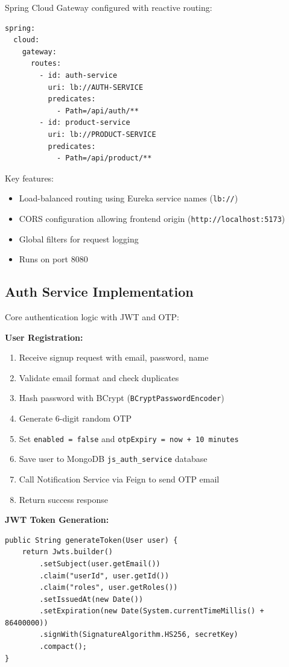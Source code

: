 Spring Cloud Gateway configured with reactive routing:

\begin{verbatim}
spring:
  cloud:
    gateway:
      routes:
        - id: auth-service
          uri: lb://AUTH-SERVICE
          predicates:
            - Path=/api/auth/**
        - id: product-service
          uri: lb://PRODUCT-SERVICE
          predicates:
            - Path=/api/product/**
\end{verbatim}

Key features:
\begin{itemize}
    \item Load-balanced routing using Eureka service names (\texttt{lb://})
    \item CORS configuration allowing frontend origin (\texttt{http://localhost:5173})
    \item Global filters for request logging
    \item Runs on port 8080
\end{itemize}

\subsection{Auth Service Implementation}

Core authentication logic with JWT and OTP:

\textbf{User Registration:}
\begin{enumerate}
    \item Receive signup request with email, password, name
    \item Validate email format and check duplicates
    \item Hash password with BCrypt (\texttt{BCryptPasswordEncoder})
    \item Generate 6-digit random OTP
    \item Set \texttt{enabled = false} and \texttt{otpExpiry = now + 10 minutes}
    \item Save user to MongoDB \texttt{js\_auth\_service} database
    \item Call Notification Service via Feign to send OTP email
    \item Return success response
\end{enumerate}

\textbf{JWT Token Generation:}
\begin{verbatim}
public String generateToken(User user) {
    return Jwts.builder()
        .setSubject(user.getEmail())
        .claim("userId", user.getId())
        .claim("roles", user.getRoles())
        .setIssuedAt(new Date())
        .setExpiration(new Date(System.currentTimeMillis() + 86400000))
        .signWith(SignatureAlgorithm.HS256, secretKey)
        .compact();
}
\end{verbatim}

